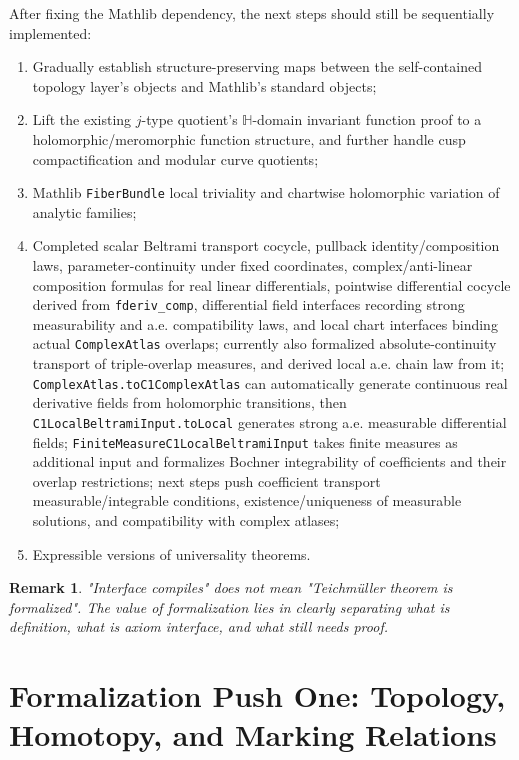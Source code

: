 \documentclass[UTF8,a4paper,11pt]{article}
\newtheorem{remark}[definition]{Remark}
\begin{document}
After fixing the Mathlib dependency, the next steps should still be sequentially implemented:

\begin{enumerate}[label=(\arabic*)]
  \item Gradually establish structure-preserving maps between the self-contained topology layer's objects and Mathlib's standard objects;
  \item Lift the existing $j$-type quotient's \(\mathbb H\)-domain invariant function proof to a holomorphic/meromorphic function structure, and further handle cusp compactification and modular curve quotients;
  \item Mathlib \texttt{FiberBundle} local triviality and chartwise holomorphic variation of analytic families;
  \item Completed scalar Beltrami transport cocycle, pullback identity/composition laws, parameter-continuity under fixed coordinates, complex/anti-linear composition formulas for real linear differentials, pointwise differential cocycle derived from \texttt{fderiv\_comp}, differential field interfaces recording strong measurability and a.e. compatibility laws, and local chart interfaces binding actual \texttt{ComplexAtlas} overlaps; currently also formalized absolute-continuity transport of triple-overlap measures, and derived local a.e. chain law from it; \texttt{ComplexAtlas.toC1ComplexAtlas} can automatically generate continuous real derivative fields from holomorphic transitions, then \texttt{C1LocalBeltramiInput.toLocal} generates strong a.e. measurable differential fields; \texttt{FiniteMeasureC1LocalBeltramiInput} takes finite measures as additional input and formalizes Bochner integrability of coefficients and their overlap restrictions; next steps push coefficient transport measurable/integrable conditions, existence/uniqueness of measurable solutions, and compatibility with complex atlases;
  \item Expressible versions of universality theorems.
\end{enumerate}

\begin{remark}
"Interface compiles" does not mean "Teichmüller theorem is formalized". The value of formalization lies in clearly separating what is definition, what is axiom interface, and what still needs proof.
\end{remark}

\section{Formalization Push One: Topology, Homotopy, and Marking Relations}
\end{document}
